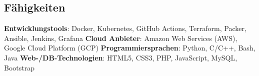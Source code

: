 \documentclass[../main.tex]{subfiles}
\begin{document}
\begin{category}
\section{Fähigkeiten}
    \citembullet \textbf{Entwicklungstools}: Docker, Kubernetes, GitHub Actions, Terraform, Packer, 
    Ansible, Jenkins, Grafana
    \citembullet \textbf{Cloud Anbieter}: Amazon Web Services (AWS), Google Cloud Platform (GCP)
    \citembullet \textbf{Programmiersprachen}: Python, C/C++, Bash, Java
    \citembullet \textbf{Web-/DB-Technologien}: HTML5, CSS3, PHP, JavaScript, MySQL, Bootstrap
    \\[-12pt]
\end{category}
\end{document}

